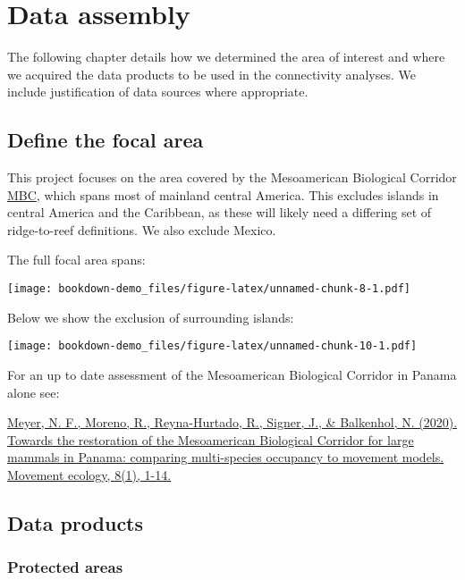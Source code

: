 \documentclass[
]{book}
\begin{document}
\hypertarget{data-assembly}{%
\chapter{Data assembly}\label{data-assembly}}

The following chapter details how we determined the area of interest and where we acquired the data products to be used in the connectivity analyses. We include justification of data sources where appropriate.

\hypertarget{define-the-focal-area}{%
\section{Define the focal area}\label{define-the-focal-area}}

This project focuses on the area covered by the Mesoamerican Biological Corridor \href{https://en.wikipedia.org/wiki/Mesoamerican_Biological_Corridor}{MBC}, which spans most of mainland central America. This excludes islands in central America and the Caribbean, as these will likely need a differing set of ridge-to-reef definitions. We also exclude Mexico.

The full focal area spans:

\texttt{[image: bookdown-demo\_files/figure-latex/unnamed-chunk-8-1.pdf]}

Below we show the exclusion of surrounding islands:

\texttt{[image: bookdown-demo\_files/figure-latex/unnamed-chunk-10-1.pdf]}

For an up to date assessment of the Mesoamerican Biological Corridor in Panama alone see:

\href{https://movementecologyjournal.biomedcentral.com/articles/10.1186/s40462-019-0186-0}{Meyer, N. F., Moreno, R., Reyna-Hurtado, R., Signer, J., \& Balkenhol, N. (2020). Towards the restoration of the Mesoamerican Biological Corridor for large mammals in Panama: comparing multi-species occupancy to movement models. Movement ecology, 8(1), 1-14.}

\hypertarget{data-products}{%
\section{Data products}\label{data-products}}

\hypertarget{protected-areas}{%
\subsection{Protected areas}\label{protected-areas}}
\end{document}
